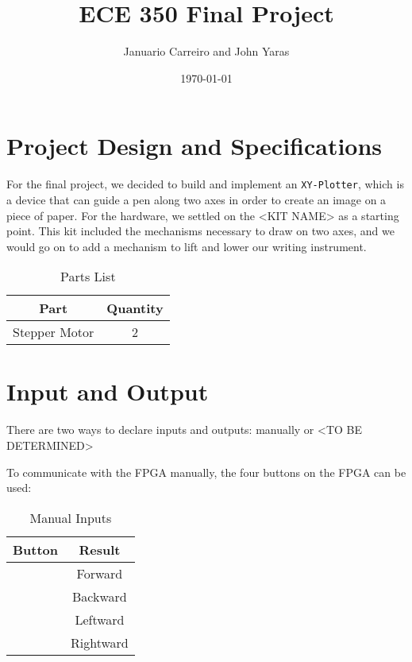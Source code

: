 \documentclass[12pt]{article}
\begin{document}
\title{ECE 350 Final Project}
\author{Januario Carreiro and John Yaras}
\date{\today}

\maketitle

\thispagestyle{fancy}

\newpage

\section{Project Design and Specifications}
For the final project, we decided to build and implement an {\tt XY-Plotter}, which is a device that can guide a pen along two axes in order to create an image on a piece of paper. For the hardware, we settled on the <KIT NAME> as a starting point. This kit included the mechanisms necessary to draw on two axes, and we would go on to add a mechanism to lift and lower our writing instrument.

\begin{table}[ht!]
\centering
\begin{tabular}{|c|c|} \hline
Part & Quantity \\ \hline \hline
Stepper Motor & 2 \\ \hline
\end{tabular}
\caption{Parts List}
\end{table}


\section{Input and Output}
There are two ways to declare inputs and outputs: manually or <TO BE DETERMINED> %

To communicate with the FPGA manually, the four buttons on the FPGA can be used:

\begin{table}[ht!]
\centering
\begin{tabular}{|c|c|} \hline
Button & Result \\ \hline \hline
 & Forward \\ \hline
 & Backward \\ \hline
 & Leftward \\ \hline
 & Rightward \\ \hline
\end{tabular}
\caption{Manual Inputs}
\end{table}
\end{document}
